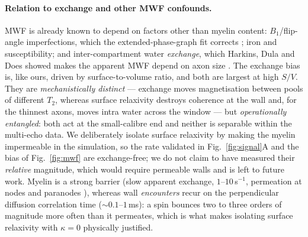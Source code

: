 \paragraph{Relation to exchange and other MWF confounds.} MWF is already known to
depend on factors other than myelin content: $B_1$/flip-angle imperfections, which
the extended-phase-graph fit corrects \citep{Prasloski2012, Lebel2010}; iron and
susceptibility; and inter-compartment water \emph{exchange}, which Harkins, Dula and
Does showed makes the apparent MWF depend on axon size \citep{Harkins2012, Dula2010}.
The exchange bias is, like ours, driven by surface-to-volume ratio, and both are largest
at high $S/V$. They are \emph{mechanistically distinct} --- exchange moves magnetisation
between pools of different $T_2$, whereas surface relaxivity destroys coherence at the wall
and, for the thinnest axons, moves intra water across the window --- but \emph{operationally
entangled}: both act at the small-calibre end and neither is separable within the multi-echo
data. We deliberately isolate surface relaxivity by making the myelin impermeable in the
simulation, so the rate validated in Fig.~\ref{fig:signal}A and the bias of
Fig.~\ref{fig:mwf} are exchange-free; we do not claim to have measured their \emph{relative}
magnitude, which would require permeable walls and is left to future work. Myelin is a strong
barrier (slow apparent exchange, $1$--$10\,$s$^{-1}$, permeation at nodes and paranodes
\citep{Nilsson2013}), whereas wall \emph{encounters} recur on the perpendicular diffusion
correlation time ($\sim$$0.1$--$1\,$ms): a spin bounces two to three orders of magnitude more
often than it permeates, which is what makes isolating surface relaxivity with $\kappa=0$
physically justified.

